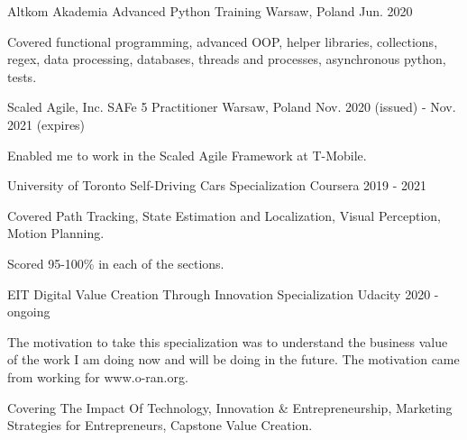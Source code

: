

\begin{cventries}

  \cventry
    {Altkom Akademia} %
    {Advanced Python Training} %
    {Warsaw, Poland} %
    {Jun. 2020} %
    {
      \begin{cvitems} %
        \item {Covered functional programming, advanced OOP, helper libraries, collections, regex, data processing, databases, threads and processes, asynchronous python, tests.}
      \end{cvitems}
    }
    
  \cventry
    {Scaled Agile, Inc.} %
    {SAFe 5 Practitioner} %
    {Warsaw, Poland} %
    {Nov. 2020 (issued) - Nov. 2021 (expires)} %
    {
      \begin{cvitems} %
        \item {Enabled me to work in the Scaled Agile Framework at T-Mobile.}
      \end{cvitems}
    }

  \cventry
    {University of Toronto} %
    {Self-Driving Cars Specialization} %
    {Coursera} %
    {2019 - 2021} %
    {
      \begin{cvitems} %
        \item {Covered Path Tracking, State Estimation and Localization, Visual Perception, Motion Planning.}
        \item {Scored 95-100\% in each of the sections.}
      \end{cvitems}
    }

  \cventry
    {EIT Digital} %
    {Value Creation Through Innovation Specialization} %
    {Udacity} %
    {2020 - ongoing} %
    {
      \begin{cvitems} %
        \item {The motivation to take this specialization was to understand the business value of the work I am doing now and will be doing in the future. The motivation came from working for www.o-ran.org.}
        \item {Covering The Impact Of Technology, Innovation \& Entrepreneurship, Marketing Strategies for Entrepreneurs, Capstone Value Creation.}
      \end{cvitems}
    }


\end{cventries}
